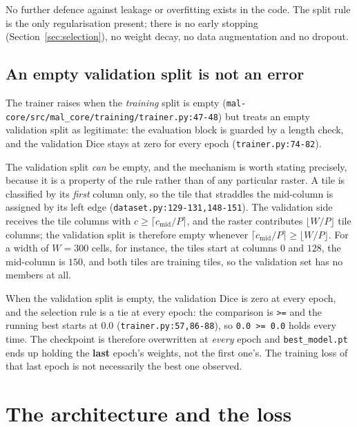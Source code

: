 \documentclass[11pt,a4paper]{article}
\newcommand{\codex}[1]{\texttt{#1}}
\begin{document}
No further defence against leakage or overfitting exists in the code. The
split rule is the only regularisation present; there is no early stopping
(Section~\ref{sec:selection}), no weight decay, no data augmentation and no
dropout.

\subsection{An empty validation split is not an error}

The trainer raises when the \emph{training} split is empty
(\codex{mal-core/\allowbreak{}src/\allowbreak{}mal\_\allowbreak{}core/\allowbreak{}training/\allowbreak{}trainer.py:47-48}) but treats an empty
validation split as legitimate: the evaluation block is guarded by a length
check, and the validation Dice stays at zero for every epoch
(\codex{trainer.py:74-82}).

The validation split \emph{can} be empty, and the mechanism is worth
stating precisely, because it is a property of the rule rather than of any
particular raster. A tile is classified by its \emph{first} column only, so
the tile that straddles the mid-column is assigned by its left edge
(\codex{dataset.py:129-131,148-151}). The validation side receives the tile
columns with \(c \ge \lceil c_{\mathrm{mid}}/P \rceil\), and the raster
contributes \(\lfloor W/P \rfloor\) tile columns; the validation split is
therefore empty whenever
\(\lceil c_{\mathrm{mid}}/P \rceil \ge \lfloor W/P \rfloor\). For a width
of \(W = 300\) cells, for instance, the tiles start at columns \(0\) and
\(128\), the mid-column is \(150\), and both tiles are training tiles, so
the validation set has no members at all.

When the validation split is empty, the validation Dice is zero at every
epoch, and the selection rule is a tie at every epoch: the comparison is
\codex{>=} and the running best starts at \(0.0\)
(\codex{trainer.py:57,86-88}), so \codex{0.0 >= 0.0} holds every time.
The checkpoint is therefore overwritten at \emph{every} epoch and
\codex{best\_model.pt} ends up holding the \textbf{last} epoch's weights,
not the first one's. The training loss of that last epoch is not necessarily
the best one observed.

\section{The architecture and the loss}
\label{sec:architecture}
\end{document}
